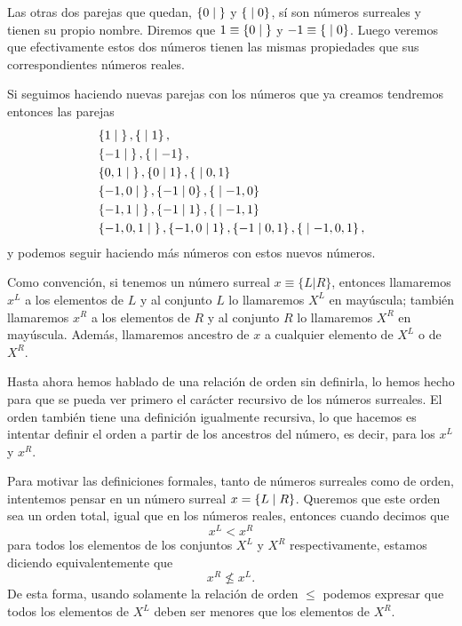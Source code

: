     Las otras dos parejas que quedan, $\left\{0\;\middle|\; \right\}$ y $\left\{\;\middle|\; 0\right\}$, s\'i son n\'umeros surreales y tienen su propio nombre. Diremos que $1 \equiv\left\{0\;\middle|\; \right\}$ y $-1 \equiv\left\{\;\middle|\; 0\right\}$. Luego veremos que efectivamente estos dos n\'umeros tienen las mismas propiedades que sus correspondientes n\'umeros reales.

    Si seguimos haciendo nuevas parejas con los n\'umeros que ya creamos tendremos entonces las parejas
    \begin{align*}
        &\left\{1\;\middle|\; \right\}, \left\{\;\middle|\; 1\right\},\\
        &\left\{-1\;\middle|\; \right\}, \left\{\;\middle|\; -1\right\}, \\
        &\left\{0,1\;\middle|\; \right\}, \left\{0\;\middle|\; 1\right\}, \left\{\;\middle|\; 0,1\right\} \\
        &\left\{-1,0\;\middle|\; \right\}, \left\{-1\;\middle|\; 0\right\}, \left\{\;\middle|\; -1,0\right\} \\
        &\left\{-1,1\;\middle|\; \right\}, \left\{-1\;\middle|\; 1\right\}, \left\{\;\middle|\; -1,1\right\} \\
        &\left\{-1,0,1\;\middle|\; \right\}, \left\{-1,0\;\middle|\; 1\right\}, \left\{-1\;\middle|\; 0,1\right\}, \left\{\;\middle|\; -1,0,1\right\},
    \end{align*}
    y podemos seguir haciendo m\'as n\'umeros con estos nuevos n\'umeros.
    
    Como convención, si tenemos un número surreal $x\equiv\{L|R\}$, entonces llamaremos $x^L$ a los elementos de $L$ y al conjunto $L$ lo llamaremos $X^L$ en may\'uscula; tambi\'en llamaremos $x^R$ a los elementos de $R$ y al conjunto $R$ lo llamaremos $X^R$ en may\'uscula. Adem\'as, llamaremos ancestro de $x$ a cualquier elemento de $X^L$ o de $X^R$.

    Hasta ahora hemos hablado de una relaci\'on de orden sin definirla, lo hemos hecho para que se pueda ver primero el car\'acter recursivo de los n\'umeros surreales. El orden tambi\'en tiene una definici\'on igualmente recursiva, lo que hacemos es intentar definir el orden a partir de los ancestros del n\'umero, es decir, para los $x^L$ y $x^R$.

    Para motivar las definiciones formales, tanto de n\'umeros surreales como de orden, intentemos pensar en un n\'umero surreal $x = \left\{L\;\middle|\; R\right\}$. Queremos que este orden sea un orden total, igual que en los n\'umeros reales, entonces cuando decimos que
    \[
        x^L < x^R
    \]
    para todos los elementos de los conjuntos $X^L$ y $X^R$ respectivamente, estamos diciendo equivalentemente que
    \[
        x^R \not\le x^L.
    \]
    De esta forma, usando solamente la relaci\'on de orden $\le$ podemos expresar que todos los elementos de $X^L$ deben ser menores que los elementos de $X^R$.

